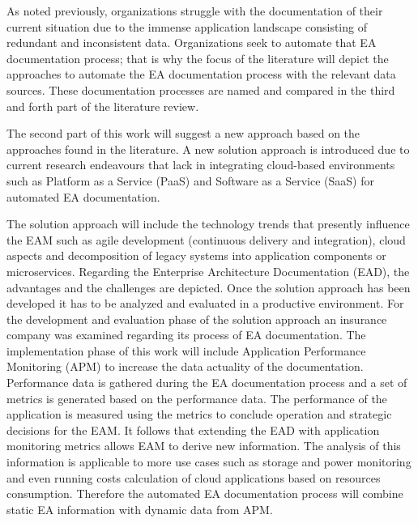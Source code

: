 As noted previously, organizations struggle with the documentation of their current situation due to the immense application landscape consisting of redundant and inconsistent data. Organizations seek to automate that EA documentation process; that is why the focus of the literature will depict the approaches to automate the EA documentation process with the relevant data sources. These documentation processes are named and compared in the third and forth part of the literature review.

The second part of this work will suggest a new approach based on the approaches found in the literature. A new solution approach is introduced due to current research endeavours that lack in integrating cloud-based environments such as Platform as a Service (PaaS) and Software as a Service (SaaS) for automated EA documentation. 

The solution approach will include the technology trends that presently influence the EAM such as agile development (continuous delivery and integration), cloud aspects and decomposition of legacy systems into application components or microservices. Regarding the Enterprise Architecture Documentation (EAD), the advantages and the challenges are depicted. Once the solution approach has been developed it has to be analyzed and evaluated in a productive environment. For the development and evaluation phase of the solution approach an insurance company was examined regarding its process of EA documentation. The implementation phase of this work will include Application Performance Monitoring (APM) to increase the data actuality of the documentation. Performance data is gathered during the EA documentation process and a set of metrics is generated based on the performance data. The performance of the application is measured using the metrics to conclude operation and strategic decisions for the EAM. It follows that extending the EAD  with application monitoring metrics allows EAM to derive new information. The analysis of this information is applicable to more use cases such as storage and power monitoring and even running costs calculation of cloud applications based on resources consumption. \cite{Rabl2012} Therefore the automated EA documentation process will combine static EA information with dynamic data from APM.

